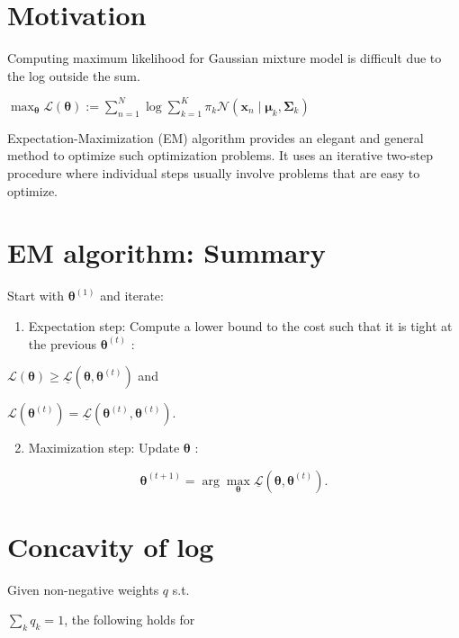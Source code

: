 
\section*{Motivation}
Computing maximum likelihood for Gaussian mixture model is difficult due to the log outside the sum.

$\max _{\boldsymbol{\theta}} \mathcal{L}(\boldsymbol{\theta}):=\sum_{n=1}^{N} \log \sum_{k=1}^{K} \pi_{k} \mathcal{N}\left(\mathbf{x}_{n} \mid \boldsymbol{\mu}_{k}, \boldsymbol{\Sigma}_{k}\right)$

Expectation-Maximization (EM) algorithm provides an elegant and general method to optimize such optimization problems. It uses an iterative two-step procedure where individual steps usually involve problems that are easy to optimize.

\section*{EM algorithm: Summary}
Start with $\boldsymbol{\theta}^{(1)}$ and iterate:

\begin{enumerate}
  \item Expectation step: Compute a lower bound to the cost such that it is tight at the previous $\boldsymbol{\theta}^{(t)}$ :
\end{enumerate}

$\mathcal{L}(\boldsymbol{\theta}) \geq \underline{\mathcal{L}}\left(\boldsymbol{\theta}, \boldsymbol{\theta}^{(t)}\right)$ and

$\mathcal{L}\left(\boldsymbol{\theta}^{(t)}\right)=\underline{\mathcal{L}}\left(\boldsymbol{\theta}^{(t)}, \boldsymbol{\theta}^{(t)}\right)$.

\begin{enumerate}
  \setcounter{enumi}{1}
  \item Maximization step: Update $\boldsymbol{\theta}$ :
\end{enumerate}

$$
\boldsymbol{\theta}^{(t+1)}=\arg \max _{\boldsymbol{\theta}} \underline{\mathcal{L}}\left(\boldsymbol{\theta}, \boldsymbol{\theta}^{(t)}\right) .
$$

\section*{Concavity of log}
Given non-negative weights $q$ s.t.

$\sum_{k} q_{k}=1$, the following holds for

